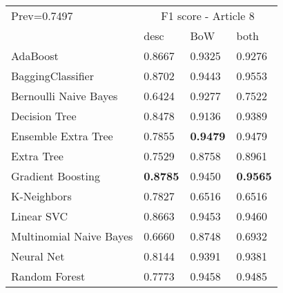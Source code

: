 \begin{tabular}{|l|l|l|l| }
\hline
Prev=0.7497 &  \multicolumn{3}{c|}{F1 score - Article 8} \\
\cline{2-4} & desc & BoW & both \\ \hline
AdaBoost                & 0.8667 & 0.9325 & 0.9276\\
BaggingClassifier       & 0.8702 & 0.9443 & 0.9553\\
Bernoulli Naive Bayes   & 0.6424 & 0.9277 & 0.7522\\
Decision Tree           & 0.8478 & 0.9136 & 0.9389\\
Ensemble Extra Tree     & 0.7855 & {\bf 0.9479} & 0.9479\\
Extra Tree              & 0.7529 & 0.8758 & 0.8961\\
Gradient Boosting       & {\bf 0.8785} & 0.9450 & {\bf 0.9565}\\
K-Neighbors             & 0.7827 & 0.6516 & 0.6516\\
Linear SVC              & 0.8663 & 0.9453 & 0.9460\\
Multinomial Naive Bayes & 0.6660 & 0.8748 & 0.6932\\
Neural Net              & 0.8144 & 0.9391 & 0.9381\\
Random Forest           & 0.7773 & 0.9458 & 0.9485\\
\hline
\end{tabular}